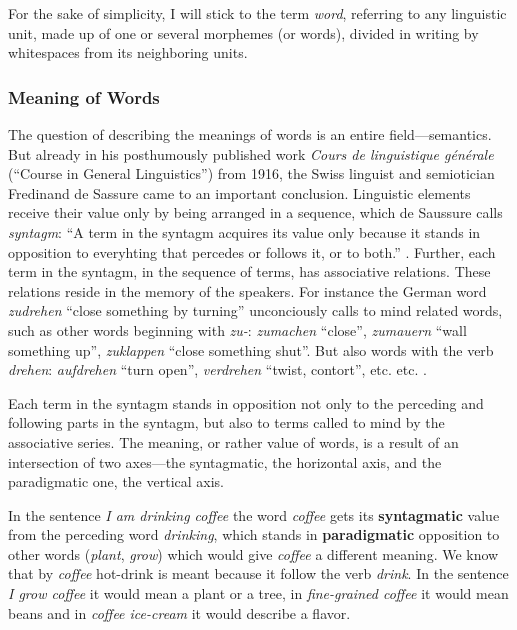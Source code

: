 For the sake of simplicity, I will stick to the term \emph{word}, referring to any linguistic unit, made up of one or several morphemes (or words), divided in writing by whitespaces from its neighboring units.

\subsubsection{Meaning of Words}
The question of describing the meanings of words is an entire field---semantics. But already in his posthumously published work \emph{Cours de linguistique générale} (\enquote{Course in General Linguistics}) from 1916, the Swiss linguist and semiotician Fredinand de Sassure came to an important conclusion. 
Linguistic elements receive their value only by being arranged in a sequence, which de Saussure calls \emph{syntagm}: 
\enquote{A term in the syntagm acquires its value only because it stands in opposition to everyhting that percedes or follows it, or to both.} \autocite[123]{de-saussure-1959-course}. Further, each term in the syntagm, in the sequence of terms, has associative relations. 
These relations reside in the memory of the speakers. 
For instance the German word \emph{zudrehen} \enquote{close something by turning} unconciously calls to mind related words, such as other words beginning with \emph{zu-}: \emph{zumachen} \enquote{close}, \emph{zumauern} \enquote{wall something up}, \emph{zuklappen} \enquote{close something shut}. 
But also words with the verb \emph{drehen}: \emph{aufdrehen} \enquote{turn open}, \emph{verdrehen} \enquote{twist, contort}, etc. etc. \autocite[122-127]{de-saussure-1959-course}.

Each term in the syntagm stands in opposition not only to the perceding and following parts in the syntagm, but also to terms called to mind by the associative series. 
The meaning, or rather value of words, is a result of an intersection of two axes---the syntagmatic, the horizontal axis, and the paradigmatic one, the vertical axis.

In the sentence \emph{I am drinking coffee} the word \emph{coffee} gets its  \textbf{syntagmatic} value from the perceding word \emph{drinking}, which stands in \textbf{paradigmatic} opposition to other words (\emph{plant}, \emph{grow}) which would give \emph{coffee} a different meaning.
We know that by \emph{coffee} hot-drink is meant because it follow the verb \emph{drink}. In the sentence \emph{I grow coffee} it would mean a plant or a tree, in \emph{fine-grained coffee} it would mean beans and in \emph{coffee ice-cream} it would describe a flavor.


